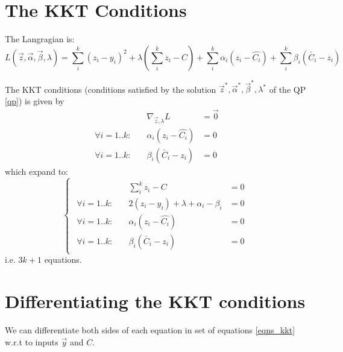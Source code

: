\documentclass[11 pt]{article}
\begin{document}
\section{The KKT Conditions}

The Langragian is:
\begin{equation}
    L(\vec{z},\vec{\alpha},\vec{\beta},\lambda) = \sum_i^k (z_i-y_i)^2 + \lambda (\sum_i^k z_i - C) + \sum_i^k \alpha_i(z_i - \hat{C_i}) + \sum_i^k \beta_i(\check{C_i} - z_i)
\end{equation}

The KKT conditions (conditions satisfied by the solution $\vec{z}^*, \vec{\alpha}^*, \vec{\beta}^*, \lambda^*$ of the QP \ref{qp}) is given by
\begin{align*}
    &\nabla_{\vec{z},\lambda} L & = \vec{0} \\
    \forall i=1..k : \quad &\alpha_i(z_i - \hat{C_i}) & = 0 \\
    \forall i=1..k : \quad &\beta_i(\check{C_i} - z_i) & = 0
\end{align*}
which expand to:
\begin{equation}\label{eqns_kkt}
    \begin{cases}
        \begin{aligned}
            &\sum_i^k z_i - C & = 0 \\
            \forall i=1..k : \quad & 2(z_i-y_i) + \lambda + \alpha_i - \beta_i & = 0 \\
            \forall i=1..k : \quad & \alpha_i(z_i - \hat{C_i}) & = 0 \\
            \forall i=1..k : \quad & \beta_i(\check{C_i} - z_i) & = 0
        \end{aligned}
    \end{cases}
\end{equation}
i.e. $3k + 1$ equations.


\section{Differentiating the KKT conditions}

We can differentiate both sides of each equation in set of equations \ref{eqns_kkt} w.r.t to inputs $\vec{y}$ and $C$.
\end{document}
